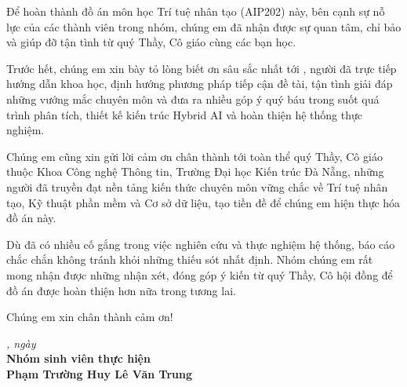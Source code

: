 \begin{acknowledgments}
Để hoàn thành đồ án môn học Trí tuệ nhân tạo (AIP202) này, bên cạnh sự nỗ lực của các thành viên trong nhóm, chúng em đã nhận được sự quan tâm, chỉ bảo và giúp đỡ tận tình từ quý Thầy, Cô giáo cùng các bạn học.

Trước hết, chúng em xin bày tỏ lòng biết ơn sâu sắc nhất tới \textbf{\dauGVHD}, người đã trực tiếp hướng dẫn khoa học, định hướng phương pháp tiếp cận đề tài, tận tình giải đáp những vướng mắc chuyên môn và đưa ra nhiều góp ý quý báu trong suốt quá trình phân tích, thiết kế kiến trúc Hybrid AI và hoàn thiện hệ thống thực nghiệm.

Chúng em cũng xin gửi lời cảm ơn chân thành tới toàn thể quý Thầy, Cô giáo thuộc Khoa Công nghệ Thông tin, Trường Đại học Kiến trúc Đà Nẵng, những người đã truyền đạt nền tảng kiến thức chuyên môn vững chắc về Trí tuệ nhân tạo, Kỹ thuật phần mềm và Cơ sở dữ liệu, tạo tiền đề để chúng em hiện thực hóa đồ án này.

Dù đã có nhiều cố gắng trong việc nghiên cứu và thực nghiệm hệ thống, báo cáo chắc chắn không tránh khỏi những thiếu sót nhất định. Nhóm chúng em rất mong nhận được những nhận xét, đóng góp ý kiến từ quý Thầy, Cô hội đồng để đồ án được hoàn thiện hơn nữa trong tương lai.

Chúng em xin chân thành cảm ơn!

\vspace{1.5cm}
\begin{flushright}
  \begin{minipage}[t]{10cm}
    \centering
    \textit{\dauNoi, ngày \ngaynop}\\[6pt]
    \textbf{Nhóm sinh viên thực hiện}\\[1.2cm]
    \textbf{Phạm Trường Huy \qquad Lê Văn Trung}
  \end{minipage}
\end{flushright}
\end{acknowledgments}
